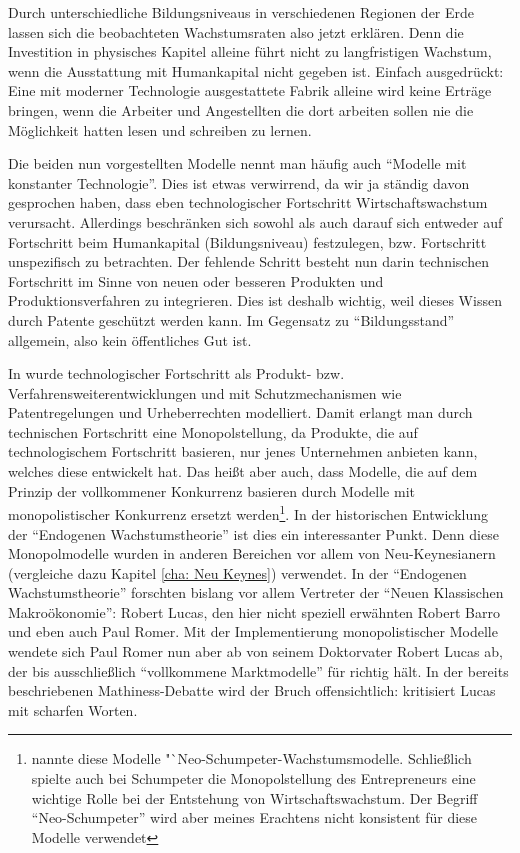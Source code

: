 Durch unterschiedliche Bildungsniveaus in verschiedenen Regionen der Erde lassen sich die beobachteten Wachstumsraten also jetzt erklären. Denn die Investition in physisches Kapitel alleine führt nicht zu langfristigen Wachstum, wenn die Ausstattung mit Humankapital nicht gegeben ist. Einfach ausgedrückt: Eine mit moderner Technologie ausgestattete Fabrik alleine wird keine Erträge bringen, wenn die Arbeiter und Angestellten die dort arbeiten sollen nie die Möglichkeit hatten lesen und schreiben zu lernen.

Die beiden nun vorgestellten Modelle nennt man häufig auch "`Modelle mit konstanter Technologie"'. Dies ist etwas verwirrend, da wir ja ständig davon gesprochen haben, dass eben technologischer Fortschritt Wirtschaftswachstum verursacht. Allerdings beschränken sich sowohl \textcite{Lucas1988} als auch \textcite{Romer1986} darauf sich entweder auf Fortschritt beim Humankapital (Bildungsniveau) festzulegen, bzw. Fortschritt unspezifisch zu betrachten. Der fehlende Schritt besteht nun darin technischen Fortschritt im Sinne von neuen oder besseren Produkten und Produktionsverfahren zu integrieren. Dies ist deshalb wichtig, weil dieses Wissen durch Patente geschützt werden kann. Im Gegensatz zu "`Bildungsstand"' allgemein, also kein öffentliches Gut ist.

In \textcite{Romer1990} wurde technologischer Fortschritt als Produkt- bzw. Verfahrensweiterentwicklungen und mit Schutzmechanismen wie Patentregelungen und Urheberrechten modelliert. Damit erlangt man durch technischen Fortschritt eine Monopolstellung, da Produkte, die auf technologischem Fortschritt basieren, nur jenes Unternehmen anbieten kann, welches diese entwickelt hat. Das heißt aber auch, dass Modelle, die auf dem Prinzip der vollkommener Konkurrenz basieren durch Modelle mit monopolistischer Konkurrenz ersetzt werden\footnote{\textcite[S. 17]{Romer1994} nannte diese Modelle "`Neo-Schumpeter-Wachstumsmodelle. Schließlich spielte auch bei Schumpeter die Monopolstellung des Entrepreneurs eine wichtige Rolle bei der Entstehung von Wirtschaftswachstum. Der Begriff "`Neo-Schumpeter"' wird aber meines Erachtens nicht konsistent für diese Modelle verwendet}. In der historischen Entwicklung der "`Endogenen Wachstumstheorie"' ist dies ein interessanter Punkt. Denn diese Monopolmodelle wurden in anderen Bereichen vor allem von Neu-Keynesianern (vergleiche dazu Kapitel \ref{cha: Neu Keynes}) verwendet. In der "`Endogenen Wachstumstheorie"' forschten bislang vor allem Vertreter der "`Neuen Klassischen Makroökonomie"': Robert Lucas, den hier nicht speziell erwähnten Robert Barro und eben auch Paul Romer. Mit der Implementierung monopolistischer Modelle wendete sich Paul Romer nun aber ab von seinem Doktorvater Robert Lucas ab, der bis ausschließlich "`vollkommene Marktmodelle"' für richtig hält. In der bereits beschriebenen Mathiness-Debatte wird der Bruch offensichtlich: \textcite[S. 91f]{Romer2015} kritisiert Lucas mit scharfen Worten.


